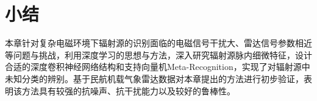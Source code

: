 \section{小结}
\label{sec:sei_summary}
本章针对复杂电磁环境下辐射源的识别面临的电磁信号干扰大、雷达信号参数相近等问题与挑战，利用深度学习的思想与方法，深入研究辐射源脉内细微特征，设计合适的深度卷积神经网络结构和支持向量机Meta-Recognition，实现了对辐射源中未知分类的辨别。基于民航机载气象雷达数据对本章提出的方法进行初步验证，表明该方法具有较强的抗噪声、抗干扰能力以及较好的鲁棒性。
